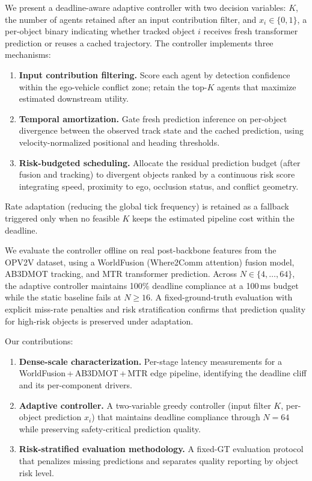 We present a deadline-aware adaptive controller with two decision
variables: $K$, the number of agents retained after an input
contribution filter, and $x_i \in \{0,1\}$, a per-object binary
indicating whether tracked object $i$ receives fresh transformer
prediction or reuses a cached trajectory.  The controller implements
three mechanisms:
%
\begin{enumerate}
  \item \textbf{Input contribution filtering.} Score each agent by
    detection confidence within the ego-vehicle conflict zone; retain
    the top-$K$ agents that maximize estimated downstream utility.
  \item \textbf{Temporal amortization.} Gate fresh prediction inference
    on per-object divergence between the observed track state and the
    cached prediction, using velocity-normalized positional and heading
    thresholds.
  \item \textbf{Risk-budgeted scheduling.} Allocate the residual
    prediction budget (after fusion and tracking) to divergent objects
    ranked by a continuous risk score integrating speed, proximity to
    ego, occlusion status, and conflict geometry.
\end{enumerate}
%
Rate adaptation (reducing the global tick frequency) is retained as a
fallback triggered only when no feasible $K$ keeps the estimated
pipeline cost within the deadline.

We evaluate the controller offline on real post-backbone features
from the OPV2V dataset, using a WorldFusion (Where2Comm attention)
fusion model, AB3DMOT tracking, and MTR transformer prediction.
Across $N \in \{4,\ldots,64\}$, the adaptive controller maintains
100\% deadline compliance at a 100\,ms budget while the static baseline
fails at $N \geq 16$.  A fixed-ground-truth evaluation with explicit
miss-rate penalties and risk stratification confirms that prediction
quality for high-risk objects is preserved under adaptation.

Our contributions:
\begin{enumerate}
  \item \textbf{Dense-scale characterization.} Per-stage latency
    measurements for a WorldFusion\,+\,AB3DMOT\,+\,MTR edge pipeline,
    identifying the deadline cliff and its per-component drivers.
  \item \textbf{Adaptive controller.} A two-variable greedy controller
    (input filter $K$, per-object prediction $x_i$) that maintains
    deadline compliance through $N=64$ while preserving safety-critical
    prediction quality.
  \item \textbf{Risk-stratified evaluation methodology.} A fixed-GT
    evaluation protocol that penalizes missing predictions and
    separates quality reporting by object risk level.
\end{enumerate}
